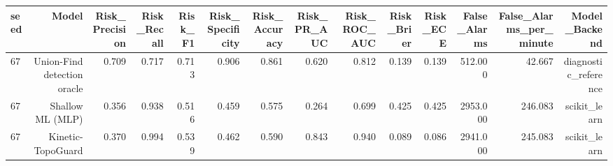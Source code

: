 \begin{tabular}{lrrrrrrrrrrrrr}
\toprule
seed & Model & Risk\_Precision & Risk\_Recall & Risk\_F1 & Risk\_Specificity & Risk\_Accuracy & Risk\_PR\_AUC & Risk\_ROC\_AUC & Risk\_Brier & Risk\_ECE & False\_Alarms & False\_Alarms\_per\_minute & Model\_Backend \\
\midrule
67 & Union-Find detection oracle & 0.709 & 0.717 & 0.713 & 0.906 & 0.861 & 0.620 & 0.812 & 0.139 & 0.139 & 512.000 & 42.667 & diagnostic\_reference \\
67 & Shallow ML (MLP) & 0.356 & 0.938 & 0.516 & 0.459 & 0.575 & 0.264 & 0.699 & 0.425 & 0.425 & 2953.000 & 246.083 & scikit\_learn \\
67 & Kinetic-TopoGuard & 0.370 & 0.994 & 0.539 & 0.462 & 0.590 & 0.843 & 0.940 & 0.089 & 0.086 & 2941.000 & 245.083 & scikit\_learn \\
\bottomrule
\end{tabular}